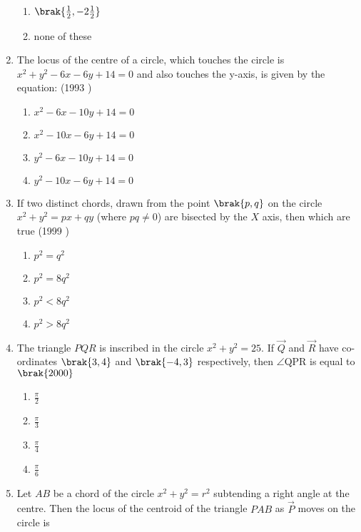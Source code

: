 \begin{enumerate}
\begin{multicols}{2}
\begin{enumerate}
    	\item $\brak{\frac{1}{2}, -2\frac{1}{2}}$
    	\item none of these
    \end{enumerate}
\end{multicols}
    \item The locus of the centre of a circle,  which touches the circle is $x^{2}+y^{2}-6x-6y+14=0$ and also touches the y-axis,  is given by the equation: \hfill {(1993 )}
    \begin{multicols}{2}
\begin{enumerate}
    	\item $x^{2}-6x-10y+14=0$
    	\item $x^{2}-10x-6y+14=0$
    	\item $y^{2}-6x-10y+14=0$
    	\item $y^{2}-10x-6y+14=0$
    \end{enumerate}
\end{multicols}
    \item If two distinct chords,  drawn from the point $\brak{p, q}$ on the circle $x^{2}+y^{2}=px+qy$ (where $pq \neq 0$) are bisected by the $X$ axis,  then which are true
    \hfill {(1999 )}
    \begin{multicols}{2}
\begin{enumerate}
    	\item $p^{2}=q^{2}$
    	\item $p^{2}=8q^{2}$ 
    	\item $p^{2}<8q^{2}$
    	\item $p^{2}>8q^{2}$
    \end{enumerate}
\end{multicols}
        \item The triangle $PQR$ is inscribed in the circle $x^2+y^2=25$. If $\vec{Q}$ and $\vec{R}$ have co-ordinates $\brak{3, 4}$ and $\brak{-4, 3}$ respectively, then $\angle$QPR is equal to  
    \hfill$\brak{2000}$
%
%
    \begin{multicols}{2}
\begin{enumerate}
%
        \item $\frac{\pi}{2}$
        \item $\frac{\pi}{3}$
        \item $\frac{\pi}{4}$
        \item $\frac{\pi}{6}$
    \end{enumerate}
    \end{multicols}
    \item Let $AB$ be a chord of the circle $x^2+y^2=r^2$ subtending a right angle at the centre. Then the locus of the centroid of the triangle $PAB$  as $\vec{P}$ moves on the circle is 

\end{enumerate}
